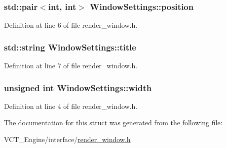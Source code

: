 \subsubsection[{position}]{\setlength{\rightskip}{0pt plus 5cm}std\+::pair$<$int, int$>$ Window\+Settings\+::position}\label{struct_window_settings_a041200534ceac3296a8eb4b0dd1bbe30}


Definition at line 6 of file render\+\_\+window.\+h.

\hypertarget{struct_window_settings_a5f56c222507f096ac106b06235ac53e8}{}
\subsubsection[{title}]{\setlength{\rightskip}{0pt plus 5cm}std\+::string Window\+Settings\+::title}\label{struct_window_settings_a5f56c222507f096ac106b06235ac53e8}


Definition at line 7 of file render\+\_\+window.\+h.

\hypertarget{struct_window_settings_a682fe02f872545c310d3d0dbf26720c7}{}
\subsubsection[{width}]{\setlength{\rightskip}{0pt plus 5cm}unsigned int Window\+Settings\+::width}\label{struct_window_settings_a682fe02f872545c310d3d0dbf26720c7}


Definition at line 4 of file render\+\_\+window.\+h.



The documentation for this struct was generated from the following file\+:\begin{DoxyCompactItemize}
\item 
V\+C\+T\+\_\+\+Engine/interface/\hyperlink{render__window_8h}{render\+\_\+window.\+h}\end{DoxyCompactItemize}
